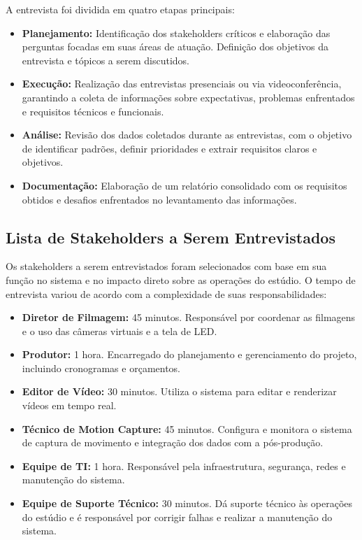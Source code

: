 A entrevista foi dividida em quatro etapas principais:

\begin{itemize}
  \item \textbf{Planejamento:} Identificação dos stakeholders críticos e elaboração das perguntas focadas em suas áreas de atuação. Definição dos objetivos da entrevista e tópicos a serem discutidos.
  \item \textbf{Execução:} Realização das entrevistas presenciais ou via videoconferência, garantindo a coleta de informações sobre expectativas, problemas enfrentados e requisitos técnicos e funcionais.
  \item \textbf{Análise:} Revisão dos dados coletados durante as entrevistas, com o objetivo de identificar padrões, definir prioridades e extrair requisitos claros e objetivos.
  \item \textbf{Documentação:} Elaboração de um relatório consolidado com os requisitos obtidos e desafios enfrentados no levantamento das informações.
\end{itemize}

\subsection{Lista de Stakeholders a Serem Entrevistados}

Os stakeholders a serem entrevistados foram selecionados com base em sua função no sistema e no impacto direto sobre as operações do estúdio. O tempo de entrevista variou de acordo com a complexidade de suas responsabilidades:

\begin{itemize}
  \item \textbf{Diretor de Filmagem:} 45 minutos. Responsável por coordenar as filmagens e o uso das câmeras virtuais e a tela de LED.
  \item \textbf{Produtor:} 1 hora. Encarregado do planejamento e gerenciamento do projeto, incluindo cronogramas e orçamentos.
  \item \textbf{Editor de Vídeo:} 30 minutos. Utiliza o sistema para editar e renderizar vídeos em tempo real.
  \item \textbf{Técnico de Motion Capture:} 45 minutos. Configura e monitora o sistema de captura de movimento e integração dos dados com a pós-produção.
  \item \textbf{Equipe de TI:} 1 hora. Responsável pela infraestrutura, segurança, redes e manutenção do sistema.
  \item \textbf{Equipe de Suporte Técnico:} 30 minutos. Dá suporte técnico às operações do estúdio e é responsável por corrigir falhas e realizar a manutenção do sistema.
\end{itemize}

